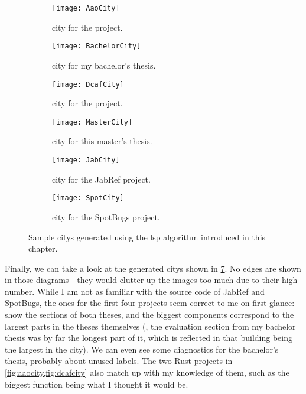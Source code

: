 \documentclass[../thesis]{subfiles}
\begin{document}
\begin{figure}
	\begin{subfigure}{0.5\textwidth}
		\centering
		\texttt{[image: AaoCity]}
		\caption{\Gls{city} for the  project.}\label{fig:aaocity}
	\end{subfigure}
	\begin{subfigure}{0.5\textwidth}
		\centering
		\texttt{[image: BachelorCity]}
		\caption{\Gls{city} for my bachelor's thesis.}\label{fig:bachcity}
	\end{subfigure}
	\begin{subfigure}{0.5\textwidth}
		\centering
		\texttt{[image: DcafCity]}
		\caption{\Gls{city} for the  project.}\label{fig:dcafcity}
	\end{subfigure}
	\begin{subfigure}{0.5\textwidth}
		\centering
		\texttt{[image: MasterCity]}
		\caption{\Gls{city} for this master's thesis.}\label{fig:mastercity}
	\end{subfigure}
	\begin{subfigure}{0.5\textwidth}
		\centering
		\texttt{[image: JabCity]}
		\caption{\Gls{city} for the JabRef project.}\label{fig:jabcity}
	\end{subfigure}
	\begin{subfigure}{0.5\textwidth}
		\centering
		\texttt{[image: SpotCity]}
		\caption{\Gls{city} for the SpotBugs project.}\label{fig:spotcity}
	\end{subfigure}
	\caption{Sample \glspl{city} generated using the \gls{lsp} algorithm introduced in this chapter.}\label{fig:gencities}
\end{figure}


Finally, we can take a look at the generated \glspl{city} shown in \cref{fig:gencities}.
No edges are shown in those diagrams---they would clutter up the images too much due to their high number.
While I am not as familiar with the source code of JabRef and SpotBugs, the ones for the first four projects seem correct to me on first glance:
 show the sections of both theses, and the biggest components correspond to the largest parts in the theses themselves (\eg, the evaluation section from my bachelor thesis was by far the longest part of it, which is reflected in that building being the largest in the \gls{city}).
We can even see some diagnostics for the bachelor's thesis, probably about unused labels.
The two Rust projects in \cref{fig:aaocity,fig:dcafcity} also match up with my knowledge of them, such as the biggest function being what I thought it would be.
\end{document}
